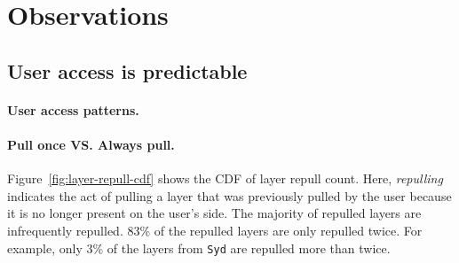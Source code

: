 \section{Observations}
\label{sec:dataset-analysis}

%
%

%




\subsection{User access is predictable}


\paragraph{User access patterns.} 

\paragraph{Pull once VS. Always pull.}
Figure~\ref{fig:layer-repull-cdf} shows the CDF of layer repull count. Here, \emph{repulling} indicates the act of pulling a layer that was previously pulled by the user because it is no longer present on the user's side.
The majority of repulled layers are infrequently repulled.
$83$\% of the repulled layers are only repulled twice.
For example, only $3$\% of the layers from \texttt{Syd} are repulled more than twice.

